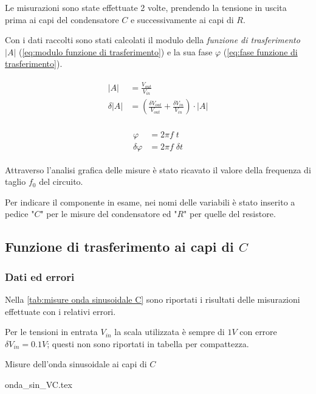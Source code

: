 \documentclass[11pt, a4paper]{article}
\numberwithin{equation}{section} %
\begin{document}
Le misurazioni sono state effettuate 2 volte, prendendo la tensione in uscita prima ai capi del condensatore $C$ e successivamente ai capi di $R$.

Con i dati raccolti sono stati calcolati il modulo della \emph{funzione di trasferimento} $|A|$ (\autoref{eq:modulo funzione di trasferimento}) e la sua fase $\varphi$ (\autoref{eq:fase funzione di trasferimento}).

\begin{align} \label{eq:modulo funzione di trasferimento}
    \begin{split}
        |A| &= \frac{V_{out}}{V_{in}} \\
        \delta |A| &= \left(\frac{\delta V_{out}}{V_{out}} + \frac{\delta V_{in}}{V_{in}}\right) \cdot |A|
    \end{split}
\end{align}

\begin{align} \label{eq:fase funzione di trasferimento}
    \begin{split}
        \varphi &= 2\pi f \; t \\
        \delta \varphi &= 2\pi f \; \delta t
    \end{split}
\end{align}

Attraverso l'analisi grafica delle misure è stato ricavato il valore della frequenza di taglio $f_{0}$ del circuito.

Per indicare il componente in esame, nei nomi delle variabili è stato inserito a pedice "$C$" per le misure del condensatore ed "$R$" per quelle del resistore.

\subsection{Funzione di trasferimento ai capi di $C$}

\subsubsection{Dati ed errori}

Nella \autoref{tab:misure onda sinusoidale C} sono riportati i risultati delle misurazioni effettuate con i relativi errori.

Per le tensioni in entrata $V_{in}$ la scala utilizzata è sempre di $1 V$ con errore $\delta V_{in} = 0.1 V$; questi non sono riportati in tabella per compattezza.

\begin{table}[ht!]
    \centering
    \caption{Misure dell'onda sinusoidale ai capi di $C$}
    {onda_sin_VC.tex}
    \label{tab:misure onda sinusoidale C}
\end{table}
\end{document}
